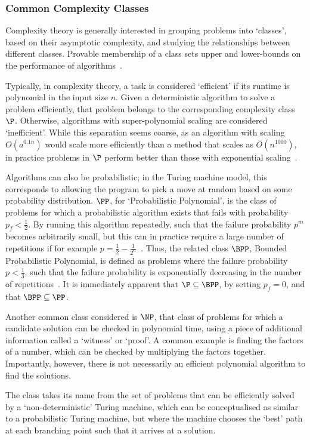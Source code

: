 \subsubsection*{Common Complexity Classes}
Complexity theory is generally interested in grouping problems into `classes', based on their asymptotic complexity, and studying the relationships between different classes. Provable membership of a class sets upper and lower-bounds on the performance of algorithms~\cite{Nielsen2000}.\par
Typically, in complexity theory, a task is considered `efficient' if its runtime is polynomial in the input size $n$. Given a deterministic algorithm to solve a problem efficiently, that problem belongs to the corresponding complexity class $\P$. Otherwise, algorithms with super-polynomial  scaling are considered `inefficient'. While this separation seems coarse, as an algorithm with scaling $O\left(a^{0.1n}\right)$ would scale more efficiently than a method that scales as $O(n^{1000})$, in practice problems in $\P$ perform better than those with exponential scaling~\cite{Nielsen2000}.\par
Algorithms can also be probabilistic; in the Turing machine model, this corresponds to allowing the program to pick a move at random based on some probability distribution. $\PP$, for `Probabilistic Polynomial', is the class of problems for which a probabilistic algorithm exists that fails with probability $p_{f}<\frac{1}{2}$. By running this algorithm repeatedly, such that the failure probability $p^{m}$ becomes arbitrarily small, but this can in practice require a large number of repetitions if for example $p=\frac{1}{2}-\frac{1}{2^{n}}$~\cite{Aaronson2004c}. Thus, the related class $\BPP$, Bounded Probabilistic Polynomial, is defined as problems where the failure probability $p < \frac{1}{3}$, such that the failure probability is exponentially decreasing in the number of repetitions~\cite{Nielsen2000}. It is immediately apparent that $\P\subseteq \BPP$, by setting $p_{f}=0$, and that $\BPP\subseteq \PP$.\par
Another common class considered is $\NP$, that class of problems for which a candidate solution can be checked in polynomial time, using a piece of additional information called a `witness' or `proof'. A common example is finding the factors of a number, which can be checked by multiplying the factors together. Importantly, however, there is not necessarily an efficient polynomial algorithm to find the solutions.\par
The class takes its name from the set of problems that can be efficiently solved by a `non-deterministic' Turing machine, which can be conceptualised as similar to a probabilistic Turing machine, but where the machine chooses the `best' path at each branching point such that it arrives at a solution.\par
